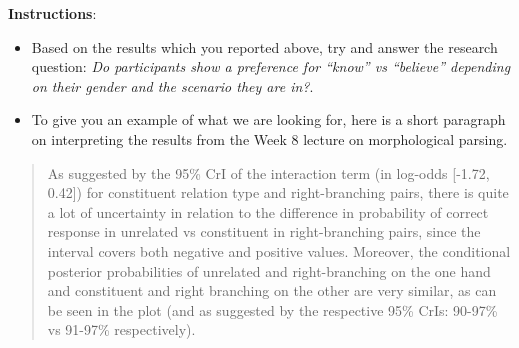 \documentclass[
]{article}
\providecommand{\tightlist}{%
  \setlength{\itemsep}{0pt}\setlength{\parskip}{0pt}}
\begin{document}
\textbf{Instructions}:

\begin{itemize}
\tightlist
\item
  Based on the results which you reported above, try and answer the
  research question: \emph{Do participants show a preference for
  ``know'' vs ``believe'' depending on their gender and the scenario
  they are in?}.
\item
  To give you an example of what we are looking for, here is a short
  paragraph on interpreting the results from the Week 8 lecture on
  morphological parsing.
\end{itemize}

\begin{quote}
As suggested by the 95\% CrI of the interaction term (in log-odds
{[}-1.72, 0.42{]}) for constituent relation type and right-branching
pairs, there is quite a lot of uncertainty in relation to the difference
in probability of correct response in unrelated vs constituent in
right-branching pairs, since the interval covers both negative and
positive values. Moreover, the conditional posterior probabilities of
unrelated and right-branching on the one hand and constituent and right
branching on the other are very similar, as can be seen in the plot (and
as suggested by the respective 95\% CrIs: 90-97\% vs 91-97\%
respectively).
\end{quote}
\end{document}

